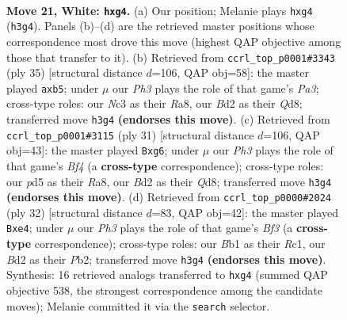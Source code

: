 \documentclass[11pt]{article}
\begin{document}
\begin{figure}[p]
\label{fig:thought-m38}
\end{figure}

\clearpage

\begin{figure}[p]\centering
\begin{subfigure}{0.46\textwidth}\centering
\resizebox{\linewidth}{!}{%
\newchessgame
\chessboard[
  setfen={rn1qr1k1/pp1bbppp/8/2PpP3/6nN/P1N4P/1P1B1PP1/1BRQR1K1 w - - 1 21},
  showmover=false,
  pgfstyle=straightmove, color=movearrow, markmove={h3-g4}
]}
\caption{}
\end{subfigure}\hfill
\begin{subfigure}{0.46\textwidth}\centering
\resizebox{\linewidth}{!}{%
\newchessgame
\chessboard[
  setfen={r2qr1k1/1p3pb1/p1bp1npp/PN6/8/4BN1P/1PP1BPP1/R2QR1K1 b - - 0 18},
  showmover=false,
  pgfstyle=straightmove, color=movearrow, markmove={a6-b5}
]}
\caption{}
\end{subfigure}
\\[4pt]
\begin{subfigure}{0.46\textwidth}\centering
\resizebox{\linewidth}{!}{%
\newchessgame
\chessboard[
  setfen={r2qr1k1/pp2bpp1/2p1pnNp/5b2/2PP1B2/P1N4P/1P2BPP1/R2QR1K1 b - - 0 16},
  showmover=false,
  pgfstyle=straightmove, color=movearrow, markmove={f5-g6}
]}
\caption{}
\end{subfigure}\hfill
\begin{subfigure}{0.46\textwidth}\centering
\resizebox{\linewidth}{!}{%
\newchessgame
\chessboard[
  setfen={r2qr1k1/3b1pp1/p1pb4/3p3p/4n3/2B1PB1P/PP2NPP1/2RQ1RK1 w - - 3 17},
  showmover=false,
  pgfstyle=straightmove, color=movearrow, markmove={f3-e4}
]}
\caption{}
\end{subfigure}
\caption{\textbf{Move 21, White: \texttt{hxg4}.} (a) Our position; Melanie plays \texttt{hxg4} (\texttt{h3g4}). Panels (b)--(d) are the retrieved master positions whose correspondence most drove this move (highest QAP objective among those that transfer to it). (b) Retrieved from \texttt{ccrl\_top\_p0001\#3343} (ply 35) [structural distance $d$=106, QAP obj=58]: the master played \texttt{axb5}; under $\mu$ our \emph{Ph3} plays the role of that game's \emph{Pa3}; cross-type roles: our \emph{N}c3 as their \emph{R}a8, our \emph{B}d2 as their \emph{Q}d8; transferred move \texttt{h3g4} \textbf{(endorses this move)}. (c) Retrieved from \texttt{ccrl\_top\_p0001\#3115} (ply 31) [structural distance $d$=106, QAP obj=43]: the master played \texttt{Bxg6}; under $\mu$ our \emph{Ph3} plays the role of that game's \emph{Bf4} (a \textbf{cross-type} correspondence); cross-type roles: our \emph{p}d5 as their \emph{R}a8, our \emph{B}d2 as their \emph{Q}d8; transferred move \texttt{h3g4} \textbf{(endorses this move)}. (d) Retrieved from \texttt{ccrl\_top\_p0000\#2024} (ply 32) [structural distance $d$=83, QAP obj=42]: the master played \texttt{Bxe4}; under $\mu$ our \emph{Ph3} plays the role of that game's \emph{Bf3} (a \textbf{cross-type} correspondence); cross-type roles: our \emph{B}b1 as their \emph{R}c1, our \emph{B}d2 as their \emph{P}b2; transferred move \texttt{h3g4} \textbf{(endorses this move)}. Synthesis: 16 retrieved analogs transferred to \texttt{hxg4} (summed QAP objective 538, the strongest correspondence among the candidate moves); Melanie committed it via the \texttt{search} selector.}

\end{figure}
\end{document}
